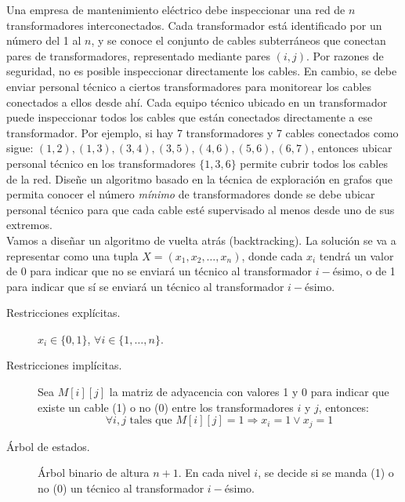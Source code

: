 \documentclass[12pt]{article}
\begin{document}
    \begin{ejercicio}[2 puntos]
        Una empresa de mantenimiento eléctrico debe inspeccionar una red de $n$ transformadores interconectados.  Cada transformador está identificado por un número del 1 al $n$, y se conoce el conjunto de cables subterráneos que conectan pares de transformadores, representado mediante pares $(i,j)$. Por razones de seguridad, no es posible inspeccionar directamente los cables. En cambio, se debe enviar personal técnico a ciertos transformadores para monitorear los cables conectados a ellos desde ahí. Cada equipo técnico ubicado en un transformador puede inspeccionar todos los cables que están conectados directamente a ese transformador. Por ejemplo, si hay 7 transformadores y 7 cables conectados como sigue: $(1, 2), (1, 3), (3, 4), (3, 5), (4, 6), (5, 6), (6, 7)$, entonces ubicar personal técnico en los transformadores $\{1,3,6\}$ permite cubrir todos los cables de la red. Diseñe un algoritmo basado en la técnica de exploración en grafos que permita conocer el número \textit{mínimo} de transformadores donde se debe ubicar personal técnico para que cada cable esté supervisado al menos desde uno de sus extremos.\\

        \noindent
        Vamos a diseñar un algoritmo de vuelta atrás (backtracking). La solución se va a representar como una tupla $X = (x_1,x_2,\ldots,x_n)$, donde cada $x_i$ tendrá un valor de 0 para indicar que no se enviará un técnico al transformador $i-$ésimo, o de 1 para indicar que sí se enviará un técnico al transformador $i-$ésimo.
        \begin{description}
            \item [Restricciones explícitas.] $x_i \in \{0,1\}$, $\forall i \in \{1,\ldots,n\}$.
            \item [Restricciones implícitas.] Sea $M[i][j]$ la matriz de adyacencia con valores 1 y 0 para indicar que existe un cable (1) o no (0) entre los transformadores $i$ y $j$, entonces:
                \begin{equation*}
                    \forall i,j \text{\ tales que\ } M[i][j] = 1 \Longrightarrow x_i = 1 \lor x_j = 1
                \end{equation*}
            \item [Árbol de estados.] Árbol binario de altura $n+1$. En cada nivel $i$, se decide si se manda (1) o no (0) un técnico al transformador $i-$ésimo.

\begin{tikzpicture}[
  level distance=2cm,
  sibling distance=1.5cm,
  every node/.style={circle, draw},
  edge from parent/.style={draw, -latex},
  level 1/.style={sibling distance=5cm},
  level 2/.style={sibling distance=2cm}
]


\end{tikzpicture}
\end{description}
\end{ejercicio}
\end{document}
